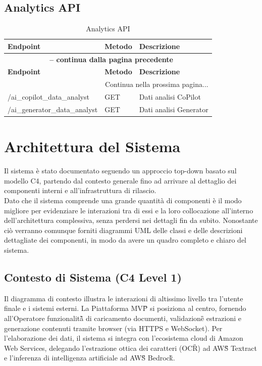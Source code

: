 \documentclass[a4paper,11pt]{article}
\begin{document}
\subsection{Analytics API}
\begin{longtable}{|p{4cm}|p{2cm}|p{7cm}|}
\caption{Analytics API}\label{tab:analytics_api}\\
\hline
\rowcolor{primaryblue!40}
\textbf{Endpoint} & \textbf{Metodo} & \textbf{Descrizione} \\
\hline
\endfirsthead

\multicolumn{3}{c}{{\bfseries \tablename\ \thetable{} -- continua dalla pagina precedente}}\\
\hline
\rowcolor{primaryblue!40}
\textbf{Endpoint} & \textbf{Metodo} & \textbf{Descrizione} \\
\hline
\endhead

\hline
\multicolumn{3}{|r|}{{Continua nella prossima pagina...}}\\
\hline
\endfoot

\hline
\endlastfoot

/ai\_copilot\_data\_analyst & GET & Dati analisi CoPilot \\
\hline
/ai\_generator\_data\_analyst & GET & Dati analisi Generator \\
\hline
\end{longtable}



\section{Architettura del Sistema}
Il sistema è stato documentato seguendo un approccio top-down basato sul modello C4, partendo dal contesto generale fino ad 
arrivare al dettaglio dei componenti interni e all'infrastruttura di rilascio. \\
Dato che il sistema comprende una grande quantità di componenti è il modo migliore per evidenziare le interazioni tra di essi e 
la loro collocazione all'interno dell'architettura complessiva, senza perdersi nei dettagli fin da subito. Nonostante ciò 
verranno comunque forniti diagrammi UML delle classi e delle descrizioni dettagliate dei componenti, 
in modo da avere un quadro completo e chiaro del sistema.

\subsection{Contesto di Sistema (C4 Level 1)}
Il diagramma di contesto illustra le interazioni di altissimo livello tra l'utente finale e i sistemi esterni.
La Piattaforma MVP\G{} si posiziona al centro, fornendo all'Operatore funzionalità\G{} di caricamento documenti, 
validazione\G{} estrazioni e generazione contenuti tramite browser (via HTTPS e WebSocket). Per l'elaborazione dei dati, 
il sistema si integra con l'ecosistema cloud di Amazon Web Services, delegando l'estrazione ottica dei caratteri 
(OCR\G{}) ad AWS\G{} Textract e l'inferenza di intelligenza artificiale ad AWS\G{} Bedrock\G{}.
\end{document}
